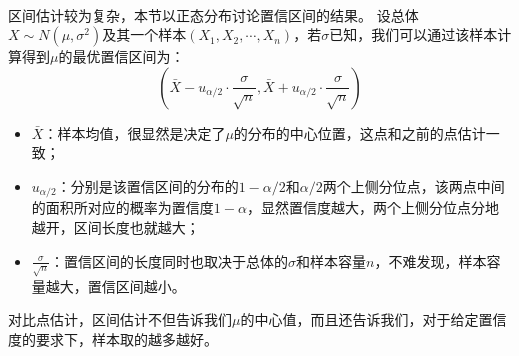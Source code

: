 ~

区间估计较为复杂，本节以正态分布讨论置信区间的结果。
设总体$X\sim N\left( \mu ,\sigma ^2 \right) $及其一个样本$\left( X_1,X_2,\cdots ,X_n \right) $，若$\sigma $已知，我们可以通过该样本计算得到$\mu $的最优置信区间为：
\[
\left( \bar{X}-u_{\alpha /2}\cdot \frac{\sigma}{\sqrt{n}},\bar{X}+u_{\alpha /2}\cdot \frac{\sigma}{\sqrt{n}} \right)
\]
\begin{itemize}
    \item $\bar{X}$：样本均值，很显然是决定了$\mu $的分布的中心位置，这点和之前的点估计一致；
    \item $u_{\alpha /2}$：分别是该置信区间的分布的$1-\alpha /2$和$\alpha /2$两个上侧分位点，该两点中间的面积所对应的概率为置信度$1-\alpha$，显然置信度越大，两个上侧分位点分地越开，区间长度也就越大；
    \item $\frac{\sigma}{\sqrt{n}}$：置信区间的长度同时也取决于总体的$\sigma $和样本容量$n$，不难发现，样本容量越大，置信区间越小。
\end{itemize}

对比点估计，区间估计不但告诉我们$\mu $的中心值，而且还告诉我们，对于给定置信度的要求下，样本取的越多越好。




